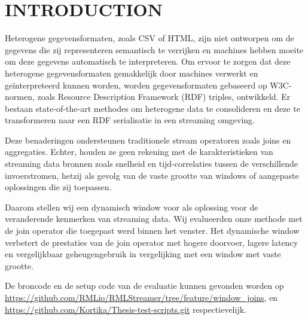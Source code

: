 \section{INTRODUCTION}
\label{chap:intro}

Heterogene gegevensformaten, zoals CSV of HTML, zijn niet
ontworpen om de gegevens die zij representeren semantisch te verrijken en 
machines hebben moeite om deze gegevens automatisch te interpreteren. 
Om ervoor te zorgen dat deze heterogene gegevensformaten gemakkelijk 
door machines verwerkt en ge\"interpreteerd kunnen worden, 
worden gegevensformaten gebaseerd op W3C-normen, zoals Resource Description 
Framework (RDF) triples, ontwikkeld. 
Er bestaan state-of-the-art methodes om heterogene data te consolideren
en deze te transformeren naar een RDF serialisatie in een streaming omgeving. 

Deze benaderingen ondersteunen traditionele stream operatoren zoals joins en aggregaties. 
Echter, houden ze geen rekening met
de karakteristieken van streaming data bronnen zoals snelheid en 
tijd-correlaties tussen de verschillende
invoerstromen, hetzij als gevolg van de 
vaste grootte van windows of aangepaste oplossingen die zij toepassen. 

Daarom stellen wij een dynamisch window voor als oplossing voor de 
veranderende kenmerken van streaming data. Wij evalueerden onze 
methode met de join operator die toegepast werd binnen het venster. 
Het dynamische window verbetert de prestaties van de 
join operator met hogere doorvoer, lagere latency en 
vergelijkbaar geheugengebruik in vergelijking met een window met vaste grootte.

De broncode en de setup code van de evaluatie kunnen gevonden worden op
\url{https://github.com/RMLio/RMLStreamer/tree/feature/window_joins}, en 
\href{https://github.com/Kortika/Thesis-test-scripts.git}{https://github.com/Kortika/Thesis-test-scripts.git} respectievelijk.
